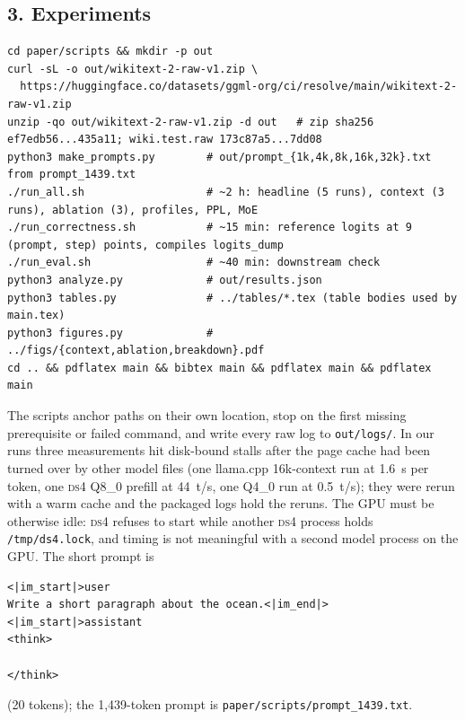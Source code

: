 \documentclass[11pt]{article}
\newcommand{\tps}{t/s}
\newcommand{\ds}{\textsc{ds4}}
\begin{document}
\subsection*{3. Experiments}
\begin{lstlisting}
cd paper/scripts && mkdir -p out
curl -sL -o out/wikitext-2-raw-v1.zip \
  https://huggingface.co/datasets/ggml-org/ci/resolve/main/wikitext-2-raw-v1.zip
unzip -qo out/wikitext-2-raw-v1.zip -d out   # zip sha256 ef7edb56...435a11; wiki.test.raw 173c87a5...7dd08
python3 make_prompts.py        # out/prompt_{1k,4k,8k,16k,32k}.txt from prompt_1439.txt
./run_all.sh                   # ~2 h: headline (5 runs), context (3 runs), ablation (3), profiles, PPL, MoE
./run_correctness.sh           # ~15 min: reference logits at 9 (prompt, step) points, compiles logits_dump
./run_eval.sh                  # ~40 min: downstream check
python3 analyze.py             # out/results.json
python3 tables.py              # ../tables/*.tex (table bodies used by main.tex)
python3 figures.py             # ../figs/{context,ablation,breakdown}.pdf
cd .. && pdflatex main && bibtex main && pdflatex main && pdflatex main
\end{lstlisting}
The scripts anchor paths on their own location, stop on the first missing
prerequisite or failed command, and write every raw log to
\texttt{out/logs/}. In our runs three measurements hit disk-bound stalls
after the page cache had been turned over by other model files (one
llama.cpp 16k-context run at 1.6~s per token, one \ds{} Q8\_0 prefill at
44~\tps{}, one Q4\_0 run at 0.5~\tps{}); they were rerun with a warm cache
and the packaged logs hold the reruns. The GPU must be otherwise idle: \ds{} refuses to start
while another \ds{} process holds \texttt{/tmp/ds4.lock}, and timing is not
meaningful with a second model process on the GPU. The short prompt is
\begin{lstlisting}
<|im_start|>user
Write a short paragraph about the ocean.<|im_end|>
<|im_start|>assistant
<think>

</think>

\end{lstlisting}
(20 tokens); the 1,439-token prompt is \texttt{paper/scripts/prompt\_1439.txt}.
\end{document}
